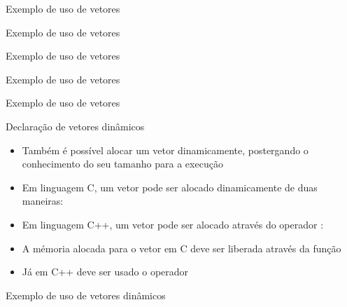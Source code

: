 \begin{frame}[fragile]{Exemplo de uso de vetores}
\end{frame}

\begin{frame}[fragile]{Exemplo de uso de vetores}
\end{frame}

\begin{frame}[fragile]{Exemplo de uso de vetores}
\end{frame}

\begin{frame}[fragile]{Exemplo de uso de vetores}
\end{frame}

\begin{frame}[fragile]{Exemplo de uso de vetores}
\end{frame}

\begin{frame}[fragile]{Declaração de vetores dinâmicos}

	\begin{itemize}
		\item Também é possível alocar um vetor dinamicamente, 
        postergando o conhecimento do seu tamanho para a execução

		\item Em linguagem C, um vetor pode ser alocado dinamicamente 
		de {duas} maneiras:

		\item Em linguagem C++, um vetor pode ser alocado através do 
		operador :

		\item A mémoria alocada para o vetor em C deve ser liberada através da função 

		\item Já em C++ deve ser usado o operador 
		
	\end{itemize}

\end{frame}

\begin{frame}[fragile]{Exemplo de uso de vetores dinâmicos}
\end{frame}

